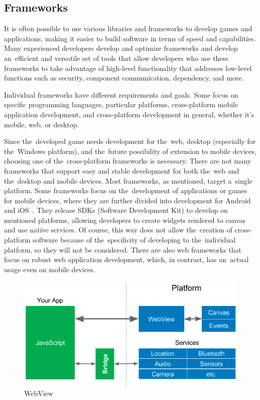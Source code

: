 \subsection{Frameworks}

It is often possible to use various libraries and frameworks to develop games and applications, making it easier to build software in terms of speed and capabilities.
Many experienced developers develop and optimize frameworks and develop an~efficient and versatile set of tools that allow developers who use these frameworks to take advantage of high-level functionality that addresses low-level functions such as security, component communication, dependency, and more.

Individual frameworks have different requirements and goals.
Some focus on specific programming languages, particular platforms, cross-platform mobile application development, and cross-platform development in general, whether it's mobile, web, or desktop.

Since the~developed game needs development for the~web, desktop (especially for the~Windows platform), and the~future possibility of extension to mobile devices, choosing one of the~cross-platform frameworks is necessary.
There are not many frameworks that support easy and stable development for both the~web and the~desktop and mobile devices.
Most frameworks, as mentioned, target a~single platform.
Some frameworks focus on the~development of applications or games for mobile devices, where they are further divided into development for Android and iOS~\cite{leler_2017_whats}.
They release SDKs (Software Development Kit) to develop on mentioned platforms, allowing developers to create widgets rendered to canvas and use native services.
Of course, this way does not allow the~creation of cross-platform software because of the~specificity of developing to the~individual platform, so they will not be considered.
There are also web frameworks that focus on robust web application development, which, in contrast, has an~actual usage even on mobile devices.

\begin{figure}
    \centering
    \includegraphics[width=1\linewidth]{assets/design/webview.png}
    \caption{WebView~\cite{leler_2017_whats}}
    \label{fig:design:webview}
\end{figure}

